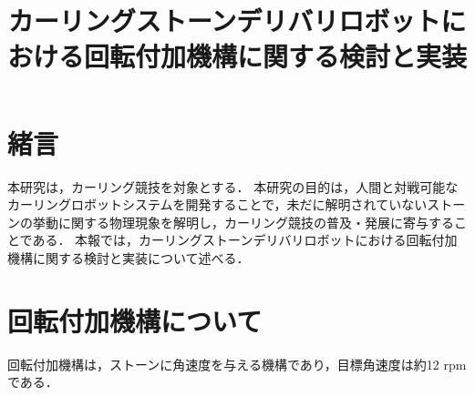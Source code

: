 \documentclass{classes/sice-si}
\title{カーリングストーンデリバリロボットにおける回転付加機構に関する検討と実装} %
\begin{document}


\maketitle

\section{緒言}
本研究は，カーリング競技を対象とする．
本研究の目的は，人間と対戦可能なカーリングロボットシステムを開発することで，未だに解明されていないストーンの挙動に関する物理現象を解明し，カーリング競技の普及・発展に寄与することである．
本報では，カーリングストーンデリバリロボットにおける回転付加機構に関する検討と実装について述べる．
\section{回転付加機構について}
回転付加機構は，ストーンに角速度を与える機構であり，目標角速度は約12 rpmである．
\end{document}

